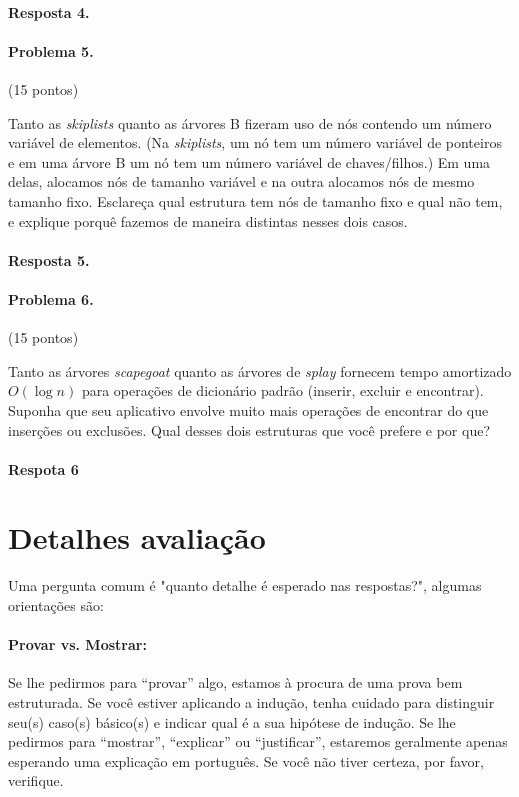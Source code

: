 \documentclass{article}
\begin{document}
\paragraph{Resposta 4.}

\paragraph{Problema 5.} (15 pontos)

Tanto as \textit{skiplists} quanto as árvores B fizeram uso de nós contendo um número variável de elementos.
(Na \textit{skiplists}, um nó tem um número variável de ponteiros e em uma árvore B um nó
tem um número variável de chaves/filhos.) Em uma delas, alocamos nós de tamanho variável
e na outra alocamos nós de mesmo tamanho fixo. Esclareça qual estrutura tem nós de tamanho fixo e qual não tem, e explique porquê fazemos de maneira distintas nesses dois casos.

\paragraph{Resposta 5.}

\paragraph{Problema 6.} (15 pontos)

Tanto as árvores \textit{scapegoat} quanto as árvores de \textit{splay} fornecem tempo amortizado $O(\log n)$ para
operações de dicionário padrão (inserir, excluir e encontrar). Suponha que seu aplicativo
envolve muito mais operações de encontrar do que inserções ou exclusões. Qual desses dois
estruturas que você prefere e por que?

\paragraph{Respota 6}

\section{Detalhes avaliação}
Uma pergunta comum é "quanto detalhe é esperado nas respostas?", algumas orientações são:
%
\paragraph{Provar vs. Mostrar:}
Se lhe pedirmos para “provar” algo, estamos à procura de uma prova bem estruturada. Se você estiver aplicando a indução, tenha cuidado para distinguir seu(s) caso(s) básico(s) e indicar qual é a sua hipótese de indução. Se lhe pedirmos para “mostrar”, “explicar” ou “justificar”, estaremos geralmente apenas esperando uma explicação em português. Se você não tiver certeza, por favor, verifique.
\end{document}
